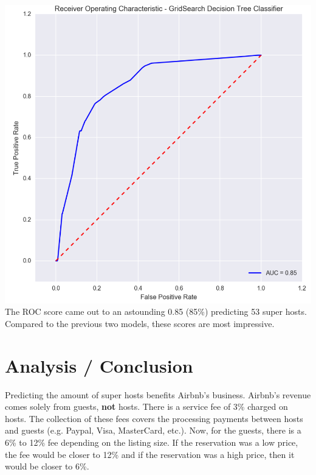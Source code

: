 \documentclass[10pt,letterpapter]{article}
\begin{document}
\begin{paragraph}
\includegraphics[scale=0.50]{dtcroc.png}
\\ 
The ROC score came out to an astounding 0.85 (85\%) predicting 53 super hosts. Compared to the previous two models, these scores are most impressive. 

\end{paragraph}

\section{Analysis / Conclusion}
\indent 
\indent
\indent
Predicting the amount of super hosts benefits Airbnb's business. Airbnb's revenue comes solely from guests, \textbf{not} hosts. There is a service fee of 3\% charged on hosts. The collection of these fees covers the processing payments between hosts and guests (e.g. Paypal, Visa, MasterCard, etc.). Now, for the guests, there is a 6\% to 12\% fee depending on the listing size. If the reservation was a low price, the fee would be closer to 12\% and if the reservation was a high price, then it would be closer to 6\%. 
\\
\end{document}
